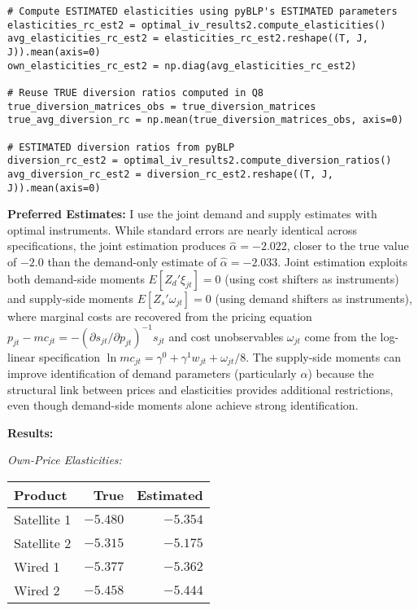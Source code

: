 \documentclass[english,11pt]{article}
\begin{document}
\begin{enumerate}
\begin{enumerate}
\begin{verbatim}
# Compute ESTIMATED elasticities using pyBLP's ESTIMATED parameters
elasticities_rc_est2 = optimal_iv_results2.compute_elasticities()
avg_elasticities_rc_est2 = elasticities_rc_est2.reshape((T, J, J)).mean(axis=0)
own_elasticities_rc_est2 = np.diag(avg_elasticities_rc_est2)

# Reuse TRUE diversion ratios computed in Q8
true_diversion_matrices_obs = true_diversion_matrices
true_avg_diversion_rc = np.mean(true_diversion_matrices_obs, axis=0)

# ESTIMATED diversion ratios from pyBLP
diversion_rc_est2 = optimal_iv_results2.compute_diversion_ratios()
avg_diversion_rc_est2 = diversion_rc_est2.reshape((T, J, J)).mean(axis=0)
\end{verbatim}

\textbf{Preferred Estimates:} I use the joint demand and supply estimates with optimal instruments. While standard errors are nearly identical across specifications, the joint estimation produces $\hat{\alpha} = -2.022$, closer to the true value of $-2.0$ than the demand-only estimate of $\hat{\alpha} = -2.033$. Joint estimation exploits both demand-side moments $E[Z_d' \xi_{jt}] = 0$ (using cost shifters as instruments) and supply-side moments $E[Z_s' \omega_{jt}] = 0$ (using demand shifters as instruments), where marginal costs are recovered from the pricing equation $p_{jt} - mc_{jt} = -(\partial s_{jt}/\partial p_{jt})^{-1} s_{jt}$ and cost unobservables $\omega_{jt}$ come from the log-linear specification $\ln mc_{jt} = \gamma^0 + \gamma^1 w_{jt} + \omega_{jt}/8$. The supply-side moments can improve identification of demand parameters (particularly $\alpha$) because the structural link between prices and elasticities provides additional restrictions, even though demand-side moments alone achieve strong identification.

\textbf{Results:}

\textit{Own-Price Elasticities:}

\begin{center}
\begin{tabular}{lrr}
\hline
Product & True & Estimated \\
\hline
Satellite 1 & $-5.480$ & $-5.354$ \\
Satellite 2 & $-5.315$ & $-5.175$ \\
Wired 1 & $-5.377$ & $-5.362$ \\
Wired 2 & $-5.458$ & $-5.444$ \\
\hline
\end{tabular}
\end{center}


\end{enumerate}
\end{enumerate}
\end{document}

